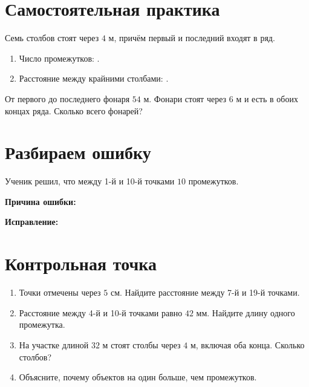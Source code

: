 \section{Самостоятельная практика}

\postrowfigure

\begin{practicebox}
  Семь столбов стоят через $4$ м, причём первый и последний входят в ряд.
  \begin{enumerate}[label=\alph*)]
    \item Число промежутков: \answerblank[18mm].
    \item Расстояние между крайними столбами: \answerblank[35mm].
  \end{enumerate}
\end{practicebox}

\begin{practicebox}
  От первого до последнего фонаря $54$ м. Фонари стоят через $6$ м и есть
  в обоих концах ряда. Сколько всего фонарей?
\end{practicebox}

\section{Разбираем ошибку}

\begin{warningbox}
  Ученик решил, что между 1-й и 10-й точками $10$ промежутков.

  \textbf{Причина ошибки:} \answerblank[100mm]

  \textbf{Исправление:} \answerblank[100mm]
\end{warningbox}

\section{Контрольная точка}

\begin{checkpointbox}
  \begin{enumerate}[label=\textbf{\arabic*.}]
    \item Точки отмечены через $5$ см. Найдите расстояние между 7-й и
      19-й точками.
    \item Расстояние между 4-й и 10-й точками равно $42$ мм. Найдите длину
      одного промежутка.
    \item На участке длиной $32$ м стоят столбы через $4$ м, включая оба
      конца. Сколько столбов?
    \item Объясните, почему объектов на один больше, чем промежутков.
  \end{enumerate}
\end{checkpointbox}

